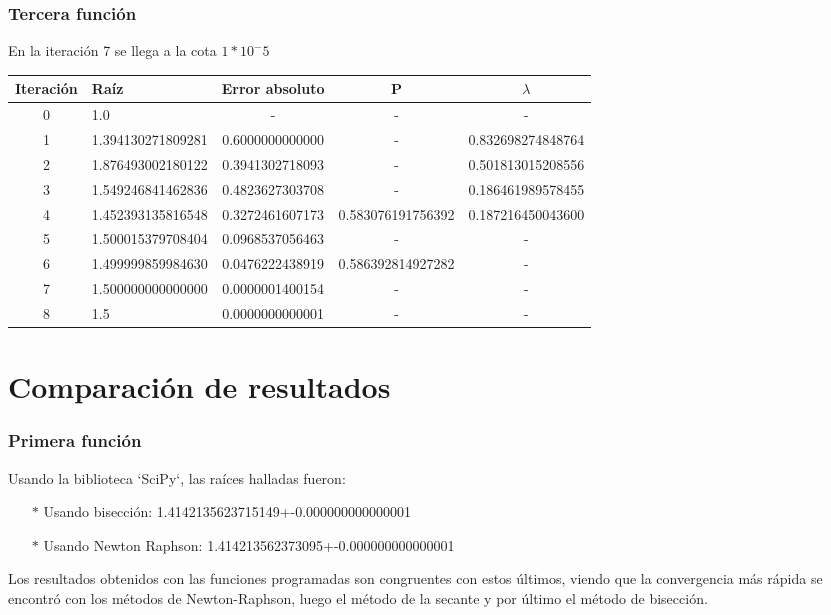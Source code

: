 \documentclass[titlepage,a4paper]{article}
\begin{document}
\newpage
\subsubsection{Tercera función}\label{sec:sec3}
En la iteración 7 se llega a la cota $1*10^-5$
\begin{center}
\begin{tabular}{| c | l | c | c | c |}
    \hline
    Iteración & Raíz & Error absoluto & P & $\lambda$ \\ \hline
    0      & 1.0  &  -  &  -  &  - \\
    1      & 1.394130271809281  &  0.6000000000000  &  -  &  0.832698274848764 \\
    2      & 1.876493002180122  &  0.3941302718093  &  -  &  0.501813015208556 \\
    3      & 1.549246841462836  &  0.4823627303708  &  -  &  0.186461989578455 \\
    4      & 1.452393135816548  &  0.3272461607173  &  0.583076191756392  &  0.187216450043600 \\
    5      & 1.500015379708404  &  0.0968537056463  &  -  &  - \\
    6      & 1.499999859984630  &  0.0476222438919  &  0.586392814927282  &  - \\
    7      & 1.500000000000000  &  0.0000001400154  & - & - \\
    8      & 1.5  &  0.0000000000001  & - & - \\
    \hline
\end{tabular}
\end{center}


\section{Comparación de resultados}\label{sec:comparacion_resultados}
\subsubsection{Primera función}\label{sec:CR1}

Usando la biblioteca `SciPy`, las raíces halladas fueron:
\begin{itemize}
    \item[$*$]Usando bisección:  1.4142135623715149+-0.000000000000001
    \item[$*$]Usando Newton Raphson:  1.414213562373095+-0.000000000000001
\end{itemize}

Los resultados obtenidos con las funciones programadas son congruentes con estos últimos, viendo que la convergencia más rápida se encontró con los métodos de Newton-Raphson, luego el método de la secante y por último el método de bisección.
\end{document}
